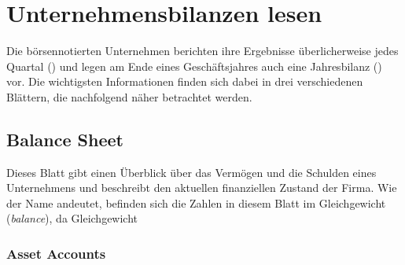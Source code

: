 
%
\chapter{Unternehmensbilanzen lesen}

Die börsennotierten Unternehmen berichten ihre Ergebnisse überlicherweise jedes Quartal  () und legen am Ende eines Geschäftsjahres auch eine Jahresbilanz () vor.
Die wichtigsten Informationen finden sich dabei in drei verschiedenen Blättern, die nachfolgend näher betrachtet werden.

%
\section{Balance Sheet}
Dieses Blatt gibt einen Überblick über das Vermögen und die Schulden eines Unternehmens und beschreibt den aktuellen finanziellen Zustand der Firma.
Wie der Name andeutet, befinden sich die Zahlen in diesem Blatt im Gleichgewicht (\textit{balance}), da Gleichgewicht

%
\subsection{Asset Accounts}

